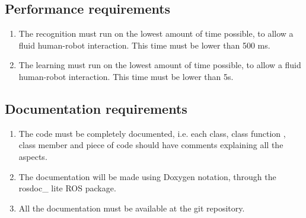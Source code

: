 \subsection{Performance requirements}

\begin{enumerate}[label=\textbf{PR\threedigits*}, leftmargin=2cm]
\item The recognition must run on the lowest amount of time possible, to allow a fluid human-robot interaction. This time must be lower than 500 ms. 
\item The learning must run on the lowest amount of time possible, to allow a fluid human-robot interaction. This time must be lower than 5s. 
\end{enumerate}



\subsection{Documentation requirements}
\begin{enumerate}[label=\textbf{DR\threedigits*}, leftmargin=2cm]
	\item The code must be completely documented, i.e. each class, class function , class member and piece of code should have comments explaining all the aspects. 
	\item The documentation will be made using Doxygen notation, through the rosdoc\_ lite 
	ROS package. 
	\item All the documentation must be available at the git repository. 
\end{enumerate}

